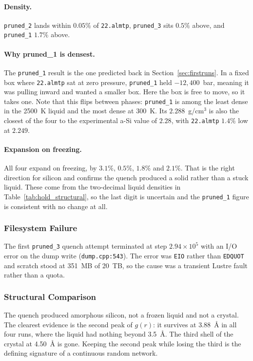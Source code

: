 \documentclass{article}
\begin{document}
\paragraph{Density.}
\texttt{pruned\_2} lands within $0.05\%$ of \texttt{22.almtp}, \texttt{pruned\_3} sits $0.5\%$ above, and \texttt{pruned\_1} $1.7\%$ above.

\paragraph{Why pruned\_1 is densest.}
The \texttt{pruned\_1} result is the one predicted back in Section~\ref{sec:firstruns}. In a fixed box where \texttt{22.almtp} sat at zero pressure, \texttt{pruned\_1} held $-12{,}400$~bar, meaning it was pulling inward and wanted a smaller box. Here the box is free to move, so it takes one. Note that this flips between phases: \texttt{pruned\_1} is among the least dense in the 2500~K liquid and the most dense at 300~K. Its $2.288$~g/cm$^3$ is also the closest of the four to the experimental a-Si value of $2.28$, with \texttt{22.almtp} $1.4\%$ low at $2.249$.

\paragraph{Expansion on freezing.}
All four expand on freezing, by $3.1\%$, $0.5\%$, $1.8\%$ and $2.1\%$. That is the right direction for silicon and confirms the quench produced a solid rather than a stuck liquid. These come from the two-decimal liquid densities in Table~\ref{tab:hold_structural}, so the last digit is uncertain and the \texttt{pruned\_1} figure is consistent with no change at all.

\subsubsection{Filesystem Failure}
\label{sec:quench_fail}
The first \texttt{pruned\_3} quench attempt terminated at step $2.94\times10^{5}$ with an I/O error on the dump write (\texttt{dump.cpp:543}). The error was \texttt{EIO} rather than \texttt{EDQUOT} and scratch stood at 351~MB of 20~TB, so the cause was a transient Lustre fault rather than a quota.

\subsubsection{Structural Comparison}

The quench produced amorphous silicon, not a frozen liquid and not a crystal. The clearest evidence is the second peak of $g(r)$: it survives at 3.88~\AA{} in all four runs, where the liquid had nothing beyond 3.5~\AA. The third shell of the crystal at 4.50~\AA{} is gone. Keeping the second peak while losing the third is the defining signature of a continuous random network.
\end{document}
